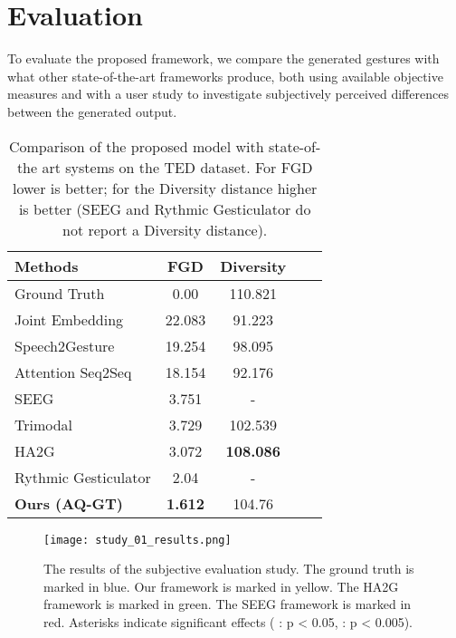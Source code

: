 \documentclass[sigconf]{acmart}
\begin{document}
\section{Evaluation}
To evaluate the proposed framework, we compare the generated gestures with what other state-of-the-art frameworks produce, both using available objective measures and with a user study to investigate subjectively perceived differences between the generated output.

\begin{table}[b]
    \caption{Comparison of the proposed model with state-of-the art systems on the TED dataset. For FGD lower is better; for the Diversity distance higher is better (SEEG and Rythmic Gesticulator  do not report a Diversity distance).}
  \centering
  \begin{tabular}{lcccc}
    \toprule
    Methods & FGD  & Diversity  \\
    \midrule
    Ground Truth & 0.00 & 110.821 \\
    \midrule
     Joint Embedding \cite{ahujaLanguage2PoseNaturalLanguage2019}   & 22.083  & 91.223\\
     Speech2Gesture \cite{ginosarLearningIndividualStyles2019a}  & 19.254  & 98.095\\
     Attention Seq2Seq \cite{yoonRobotsLearnSocial2019a} & 18.154 & 92.176\\
     SEEG \cite{liangSEEGSemanticEnergized2022}   & 3.751 & -\\
     Trimodal \cite{yoonSpeechGestureGeneration2020}   & 3.729 & 102.539\\
     HA2G \cite{liuLearningHierarchicalCrossModal2022a}   & 3.072 & \textbf{108.086}\\
     Rythmic Gesticulator \cite{aoRhythmicGesticulatorRhythmAware2022a}  & 2.04 & -\\
     \midrule 
     \textbf{Ours (AQ-GT)} & \textbf{1.612} & 104.76\\
    \bottomrule
  \end{tabular}
  \label{tbl:ted_res}
\end{table}

\begin{figure*}[t]
  \centering
  \texttt{[image: study\_01\_results.png]}
  \caption{The results of the subjective evaluation study. The ground truth is marked in blue. Our framework is marked in yellow. The HA2G framework is marked in green. The SEEG framework is marked in red. Asterisks indicate significant effects (\text{*} : p < 0.05, \text{*}\text{*} : p < 0.005).}
  \label{fig:study_result}
\end{figure*}
\end{document}
